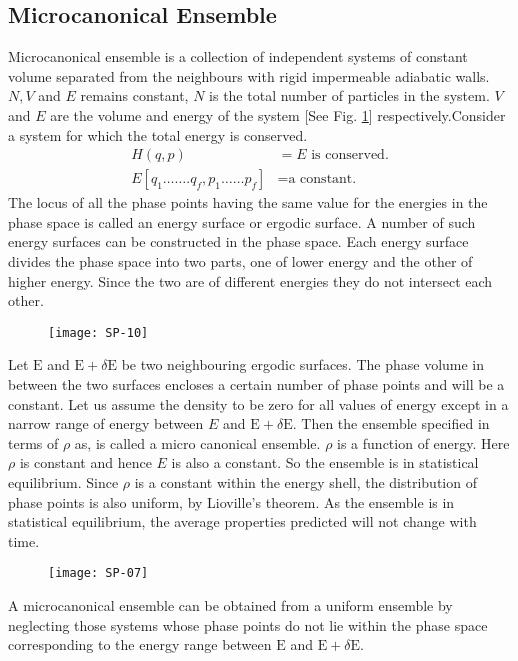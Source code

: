 \subsection{Microcanonical Ensemble}
Microcanonical ensemble is a collection of independent systems of constant volume separated from the neighbours with rigid impermeable adiabatic walls. $N, V$ and $E$ remains constant, $N$ is the total number of particles in the system. $V$ and $E$ are the volume and energy of the system [See Fig. \ref{SP-02}] respectively.Consider a system for which the total energy is conserved.
\begin{align*}
H(q, p)&=E \text{ is conserved.}\\
E\left[q_{1} \ldots \ldots . q_{f}, p_{1} \ldots \ldots p_{f}\right]&=\text{a constant.}
\end{align*}
The locus of all the phase points having the same value for the energies in the phase space is called an energy surface or ergodic surface. A number of such energy surfaces can be constructed in the phase space. Each energy surface divides the phase space into two parts, one of lower energy and the other of higher energy. Since the two are of different energies they do not intersect each other.
\begin{figure}[H]
	\centering
	\texttt{[image: SP-10]}
		\caption{}
		\label{SP-02}
\end{figure}
Let $\mathrm{E}$ and $\mathrm{E}+\delta \mathrm{E}$ be two neighbouring ergodic surfaces. The phase volume in between the two surfaces encloses a certain number of phase points and will be a constant. Let us assume the density to be zero for all values of energy except in a narrow range of energy between $E$ and $\mathrm{E}+\delta \mathrm{E}$. Then the ensemble specified in terms of $\rho$ as, is called a micro canonical ensemble.
$\rho$ is a function of energy. Here $\rho$ is constant and hence $E$ is also a constant. So the ensemble is in statistical equilibrium. Since $\rho$ is a constant within the energy shell, the distribution of phase points is also uniform, by Lioville's theorem. As the ensemble is in statistical equilibrium, the average properties predicted will not change with time.\\
\begin{figure}[H]
	\centering
	\texttt{[image: SP-07]}
\end{figure}
A microcanonical ensemble can be obtained from a uniform ensemble by neglecting those systems whose phase points do not lie within the phase space corresponding to the energy range between $\mathrm{E}$ and $\mathrm{E}+\delta \mathrm{E}$.
